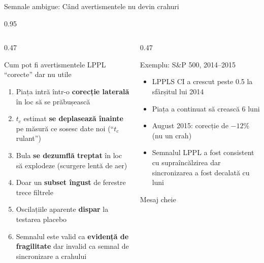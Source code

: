 \documentclass[9pt, aspectratio=169, t]{beamer}
\begin{document}
\begin{frame}{Semnale ambigue: Când avertismentele nu devin crahuri}
    \begin{cminipage}{0.95\textwidth}
    {\scriptsize
    \begin{columns}[T]
        \begin{column}{0.47\textwidth}
            \begin{block}{Cum pot fi avertismentele LPPL ``corecte'' dar nu utile}
                \begin{enumerate}\setlength{\itemsep}{1pt}
                    \item Piața intră într-o \textbf{corecție laterală} în loc să se prăbușească
                    \item $t_c$ estimat \textbf{se deplasează înainte} pe măsură ce sosesc date noi (``$t_c$ rulant'')
                    \item Bula \textbf{se dezumflă treptat} în loc să explodeze (scurgere lentă de aer)
                    \item Doar un \textbf{subset îngust} de ferestre trece filtrele
                    \item Oscilațiile aparente \textbf{dispar} la testarea placebo
                    \item Semnalul este valid ca \textbf{evidență de fragilitate} dar invalid ca semnal de sincronizare a crahului
                \end{enumerate}
            \end{block}
        \end{column}
        \begin{column}{0.47\textwidth}
            \begin{alertblock}{Exemplu: S\&P 500, 2014--2015}
                \begin{itemize}\setlength{\itemsep}{0pt}
                    \item LPPLS CI a crescut peste 0.5 la sfârșitul lui 2014
                    \item Piața a continuat să crească 6 luni
                    \item August 2015: corecție de $-12\%$ (nu un crah)
                    \item Semnalul LPPL a fost consistent cu supraîncălzirea dar sincronizarea a fost decalată cu luni
                \end{itemize}
            \end{alertblock}
            \vspace{-2mm}
            \begin{exampleblock}{Mesaj cheie}

\end{exampleblock}
\end{column}
\end{columns}}
\end{cminipage}
\end{frame}
\end{document}
